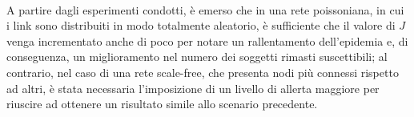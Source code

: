 \medskip
\\
%
A partire dagli esperimenti condotti, è emerso che in una rete poissoniana, in cui i link sono distribuiti in modo totalmente aleatorio, è sufficiente che il valore di $ J $ venga incrementato anche di poco per notare un rallentamento dell'epidemia e, di conseguenza, un miglioramento nel numero dei soggetti rimasti suscettibili; al contrario, nel caso di una rete scale-free, che presenta nodi più connessi rispetto ad altri, è stata necessaria l'imposizione di un livello di allerta maggiore per riuscire ad ottenere un risultato simile allo scenario precedente.\\
